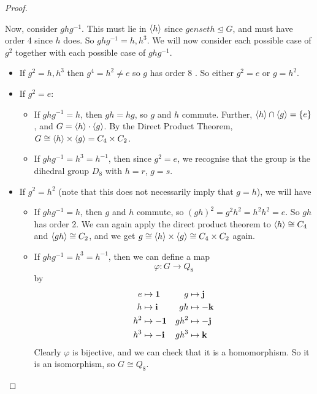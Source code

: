 \documentclass{article}
\begin{document}
\begin{proof}
\begin{itemize}
              Now, consider $ghg^{-1}$. This must lie in $\langle h \rangle$ since $genset{h} \trianglelefteq G$, and must have order 4 since $h$ does. So $ghg^{-1} = h, h^3$. We will now consider each possible case of $g^2$ together with each possible case of $ghg^{-1}$.
              \begin{itemize}
                  \item If $g^2 = h, h^3$ then $g^4 = h^2 \neq e$ so $g$ has order 8 \contradiction. So either $g^2 = e$ or $g=h^2$.
                  \item If $g^2 = e$:
                        \begin{itemize}
                            \item If $ghg^{-1} = h$, then $gh = hg$, so $g$ and $h$ commute. Further, $\langle h \rangle \cap \langle g \rangle = \{ e \}$, and $G = \langle h \rangle \cdot \langle g \rangle$. By the Direct Product Theorem, $G \cong \langle h \rangle \times \langle g \rangle = C_4 \times C_2$.
                            \item If $ghg^{-1} = h^3 = h^{-1}$, then since $g^2 = e$, we recognise that the group is the dihedral group $D_8$ with $h=r$, $g=s$.
                        \end{itemize}
                  \item If $g^2 = h^2$ (note that this does not necessarily imply that $g=h$), we will have
                        \begin{itemize}
                            \item If $ghg^{-1} = h$, then $g$ and $h$ commute, so $(gh)^2 = g^2h^2 = h^2h^2 = e$. So $gh$ has order 2. We can again apply the direct product theorem to $\langle h \rangle \cong C_4$ and $\langle gh \rangle \cong C_2$, and we get $g \cong \langle h \rangle \times \langle g \rangle \cong C_4 \times C_2$ again.
                            \item If $ghg^{-1} = h^3 = h^{-1}$, then we can define a map
                                  \[ \varphi \colon G \to Q_8 \]
                                  by
                                  \begin{align*}
                                      e   & \mapsto \vb 1  & g    & \mapsto \vb j  \\
                                      h   & \mapsto \vb i  & gh   & \mapsto -\vb k \\
                                      h^2 & \mapsto -\vb 1 & gh^2 & \mapsto -\vb j \\
                                      h^3 & \mapsto -\vb i & gh^3 & \mapsto \vb k
                                  \end{align*}
                                  Clearly $\varphi$ is bijective, and we can check that it is a homomorphism. So it is an isomorphism, so $G \cong Q_8$.
                        \end{itemize}
              \end{itemize}
    \end{itemize}
\end{proof}
\end{document}
